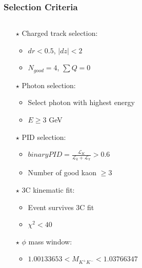 \documentclass[aspectratio=169]{ctexbeamer}
\begin{document}
\begin{frame}
  \frametitle{Selection Criteria}
  \begin{columns}
    \begin{column}{0.5\textwidth}
      \begin{itemize}
        \item[$\star$] Charged track selection:
          \begin{itemize}
            \item $dr < 0.5$, $|dz| < 2$
            \item $N_{good} = 4$, $\sum Q = 0$
          \end{itemize}
        
        \item[$\star$] Photon selection:
          \begin{itemize}
            \item Select photon with highest energy
            \item $E \geq 3$ GeV
          \end{itemize}
          
        \item[$\star$] PID selection:
          \begin{itemize}
            \item $binaryPID = \frac{\mathcal{L}_{K}}{\mathcal{L}_k + \mathcal{L}_{\pi}} > 0.6$
            \item Number of good kaon $ \geq 3$
          \end{itemize}
          
        \item[$\star$] 3C kinematic fit:
          \begin{itemize}
            \item Event survives 3C fit
            \item $\chi^2 < 40$
          \end{itemize}
          
        \item[$\star$] $\phi$ mass window:
          \begin{itemize}
            \item $1.00133653 < M_{K^+K^-} < 1.03766347$
          \end{itemize}
          

\end{itemize}
\end{column}
\end{columns}
\end{frame}
\end{document}
